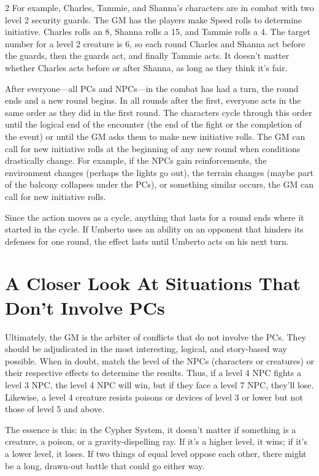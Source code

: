 \begin{multicols}{2}
For example, Charles, Tammie, and Shanna’s characters are in combat with two level 2 security guards. The GM has the players make Speed rolls to determine initiative. Charles rolls an 8, Shanna rolls a 15, and Tammie rolls a 4. The target number for a level 2 creature is 6, so each round Charles and Shanna act before the guards, then the guards act, and finally Tammie acts. It doesn’t matter whether Charles acts before or after Shanna, as long as they think it’s fair.

After everyone—all PCs and NPCs—in the combat has had a turn, the round ends and a new round begins. In all rounds after the first, everyone acts in the same order as they did in the first round. The characters cycle through this order until the logical end of the encounter (the end of the fight or the completion of the event) or until the GM asks them to make new initiative rolls. The GM can call for new initiative rolls at the beginning of any new round when conditions drastically change. For example, if the NPCs gain reinforcements, the environment changes (perhaps the lights go out), the terrain changes (maybe part of the balcony collapses under the PCs), or something similar occurs, the GM can call for new initiative rolls.

Since the action moves as a cycle, anything that lasts for a round ends where it started in the cycle. If Umberto uses an ability on an opponent that hinders its defenses for one round, the effect lasts until Umberto acts on his next turn.

\section{A Closer Look At Situations That Don't Involve PCs}

Ultimately, the GM is the arbiter of conflicts that do not involve the PCs. They should be adjudicated in the most interesting, logical, and story-based way possible. When in doubt, match the level of the NPCs (characters or creatures) or their respective effects to determine the results. Thus, if a level 4 NPC fights a level 3 NPC, the level 4 NPC will win, but if they face a level 7 NPC, they’ll lose. Likewise, a level 4 creature resists poisons or devices of level 3 or lower but not those of level 5 and above.

The essence is this: in the Cypher System, it doesn’t matter if something is a creature, a poison, or a gravity-dispelling ray. If it’s a higher level, it wins; if it’s a lower level, it loses. If two things of equal level oppose each other, there might be a long, drawn-out battle that could go either way.


\end{multicols}
